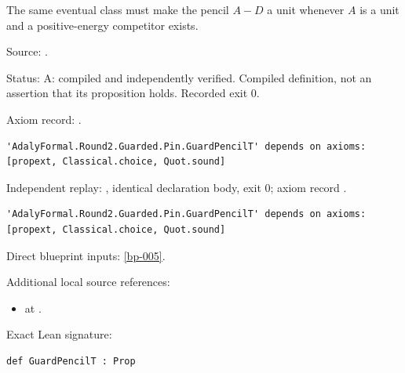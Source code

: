 \begin{definition}[bp-004]
\label{bp-004}
\leanok
The same eventual class must make the pencil \(A-D\) a unit whenever \(A\) is a unit and a positive-energy competitor exists.

\par Source: \texttt{}.
\par Status: A: compiled and independently verified. Compiled definition, not an assertion that its proposition holds. Recorded exit 0.
\par Axiom record: \texttt{}.
\begin{verbatim}
'AdalyFormal.Round2.Guarded.Pin.GuardPencilT' depends on axioms: [propext, Classical.choice, Quot.sound]
\end{verbatim}
\par Independent replay: \texttt{}, identical declaration body, exit 0; axiom record \texttt{}.
\begin{verbatim}
'AdalyFormal.Round2.Guarded.Pin.GuardPencilT' depends on axioms: [propext, Classical.choice, Quot.sound]
\end{verbatim}
\par Direct blueprint inputs: \ref{bp-005}.
\par Additional local source references:
\begin{itemize}
\item \texttt{} at \texttt{}.
\end{itemize}
\par Exact Lean signature:
\begin{verbatim}
def GuardPencilT : Prop
\end{verbatim}
\end{definition}

